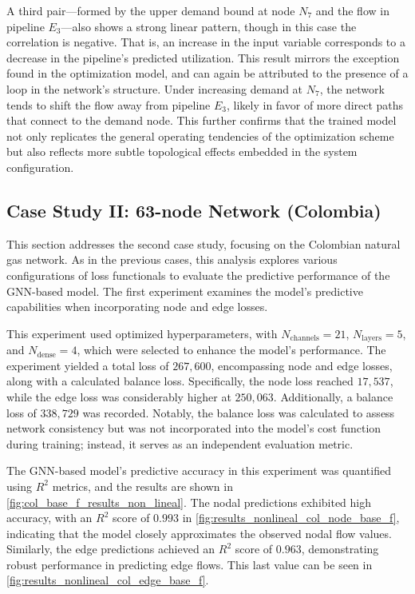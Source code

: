 A third pair—formed by the upper demand bound at node $N_7$ and the flow in pipeline $E_3$—also shows a strong linear pattern, though in this case the correlation is negative. That is, an increase in the input variable corresponds to a decrease in the pipeline’s predicted utilization. This result mirrors the exception found in the optimization model, and can again be attributed to the presence of a loop in the network’s structure. Under increasing demand at $N_7$, the network tends to shift the flow away from pipeline $E_3$, likely in favor of more direct paths that connect to the demand node. This further confirms that the trained model not only replicates the general operating tendencies of the optimization scheme but also reflects more subtle topological effects embedded in the system configuration.
















\subsection{Case Study II: 63-node Network (Colombia)}


This section addresses the second case study, focusing on the Colombian natural gas network. As in the previous cases, this analysis explores various configurations of loss functionals to evaluate the predictive performance of the GNN-based model. The first experiment examines the model's predictive capabilities when incorporating node and edge losses.


This experiment used optimized hyperparameters, with \( N_{\text{channels}} = 21 \), \( N_{\text{layers}} = 5 \), and \( N_{\text{dense}} = 4 \), which were selected to enhance the model's performance. The experiment yielded a total loss of \( 267,600 \), encompassing node and edge losses, along with a calculated balance loss. Specifically, the node loss reached \( 17,537 \), while the edge loss was considerably higher at \( 250,063 \). Additionally, a balance loss of \( 338,729 \) was recorded. Notably, the balance loss was calculated to assess network consistency but was not incorporated into the model's cost function during training; instead, it serves as an independent evaluation metric. 

The GNN-based model's predictive accuracy in this experiment was quantified using \( R^2 \) metrics, and the results are shown in \cref{fig:col_base_f_results_non_lineal}. The nodal predictions exhibited high accuracy, with an \( R^2 \) score of \( 0.993 \) in \cref{fig:results_nonlineal_col_node_base_f}, indicating that the model closely approximates the observed nodal flow values. Similarly, the edge predictions achieved an \( R^2 \) score of \( 0.963 \), demonstrating robust performance in predicting edge flows. This last value can be seen in \cref{fig:results_nonlineal_col_edge_base_f}.


